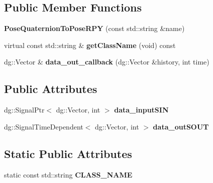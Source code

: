 \subsection*{Public Member Functions}
\begin{DoxyCompactItemize}
\item 
{\bfseries Pose\+Quaternion\+To\+Pose\+R\+PY} (const std\+::string \&name)\hypertarget{classdg__tools_1_1PoseQuaternionToPoseRPY_a0448f85839f5548a9ce8db65a31928df}{}\label{classdg__tools_1_1PoseQuaternionToPoseRPY_a0448f85839f5548a9ce8db65a31928df}

\item 
virtual const std\+::string \& {\bfseries get\+Class\+Name} (void) const \hypertarget{classdg__tools_1_1PoseQuaternionToPoseRPY_a6add152d85612d3d5c102daa7a380a8e}{}\label{classdg__tools_1_1PoseQuaternionToPoseRPY_a6add152d85612d3d5c102daa7a380a8e}

\item 
dg\+::\+Vector \& {\bfseries data\+\_\+out\+\_\+callback} (dg\+::\+Vector \&history, int time)\hypertarget{classdg__tools_1_1PoseQuaternionToPoseRPY_a465523da36b94ef86fe20298b8984feb}{}\label{classdg__tools_1_1PoseQuaternionToPoseRPY_a465523da36b94ef86fe20298b8984feb}

\end{DoxyCompactItemize}
\subsection*{Public Attributes}
\begin{DoxyCompactItemize}
\item 
dg\+::\+Signal\+Ptr$<$ dg\+::\+Vector, int $>$ {\bfseries data\+\_\+input\+S\+IN}\hypertarget{classdg__tools_1_1PoseQuaternionToPoseRPY_ae32171988c5e9efee47e78de71c692b5}{}\label{classdg__tools_1_1PoseQuaternionToPoseRPY_ae32171988c5e9efee47e78de71c692b5}

\item 
dg\+::\+Signal\+Time\+Dependent$<$ dg\+::\+Vector, int $>$ {\bfseries data\+\_\+out\+S\+O\+UT}\hypertarget{classdg__tools_1_1PoseQuaternionToPoseRPY_a84652f7e1f7023d48418a311ed7ae42e}{}\label{classdg__tools_1_1PoseQuaternionToPoseRPY_a84652f7e1f7023d48418a311ed7ae42e}

\end{DoxyCompactItemize}
\subsection*{Static Public Attributes}
\begin{DoxyCompactItemize}
\item 
static const std\+::string {\bfseries C\+L\+A\+S\+S\+\_\+\+N\+A\+ME}\hypertarget{classdg__tools_1_1PoseQuaternionToPoseRPY_afcb55058e0af2e02f6d2ac4e8354f7a9}{}\label{classdg__tools_1_1PoseQuaternionToPoseRPY_afcb55058e0af2e02f6d2ac4e8354f7a9}

\end{DoxyCompactItemize}


